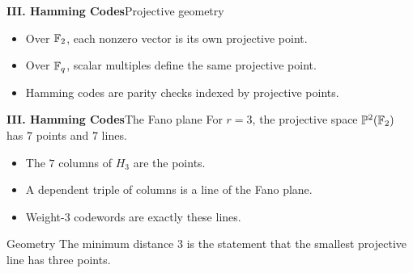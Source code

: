 \begin{frame}{\textbf{III. Hamming Codes}}{Projective geometry}
\small
{}
\begin{itemize}
  \item Over $\mathbb{F}_2$, each nonzero vector is its own projective point.
  \item Over $\mathbb{F}_q$, scalar multiples define the same projective point.
  \item Hamming codes are parity checks indexed by projective points.
\end{itemize}
\end{frame}

\begin{frame}{\textbf{III. Hamming Codes}}{The Fano plane}
\small
For $r=3$, the projective space $\mathbb{P}^2(\mathbb{F}_2)$ has $7$ points and $7$ lines.
\begin{itemize}
  \item The $7$ columns of $H_3$ are the points.
  \item A dependent triple of columns is a line of the Fano plane.
  \item Weight-$3$ codewords are exactly these lines.
\end{itemize}
\begin{block}{Geometry}
The minimum distance $3$ is the statement that the smallest projective line has three points.
\end{block}
\end{frame}

